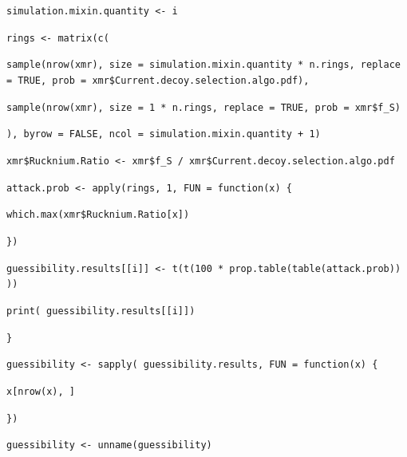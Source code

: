 \documentclass[english]{paper}
\begin{document}
{\begin{minipage}[t]{1\columnwidth - 2\fboxsep - 2\fboxrule}
\texttt{simulation.mixin.quantity <- i}

\texttt{rings <- matrix(c(}

\texttt{sample(nrow(xmr), size = simulation.mixin.quantity {*} n.rings,
replace = TRUE, prob = xmr\$Current.decoy.selection.algo.pdf),}

\texttt{sample(nrow(xmr), size = 1 {*} n.rings, replace = TRUE, prob
= xmr\$f\_S)}

\texttt{), byrow = FALSE, ncol = simulation.mixin.quantity + 1)}

\texttt{xmr\$Rucknium.Ratio <- xmr\$f\_S / xmr\$Current.decoy.selection.algo.pdf}

\texttt{attack.prob <- apply(rings, 1, FUN = function(x) \{}

\texttt{which.max(xmr\$Rucknium.Ratio{[}x{]})}

\texttt{\})}

\texttt{guessibility.results{[}{[}i{]}{]} <- t(t(100 {*} prop.table(table(attack.prob))
))}

\texttt{print( guessibility.results{[}{[}i{]}{]})}

\texttt{\}}

\texttt{guessibility <- sapply( guessibility.results, FUN = function(x)
\{}

\texttt{x{[}nrow(x), {]}}

\texttt{\})}

\texttt{guessibility <- unname(guessibility)}%
\end{minipage}}

\noindent{}
\end{document}

